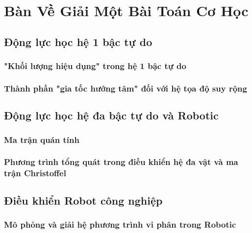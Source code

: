   
\chapter{Bàn Về Giải Một Bài Toán Cơ Học}

\section{Động lực học hệ 1 bậc tự do}

\subsection{"Khối lượng hiệu dụng" trong hệ 1 bậc tự do}

\subsection{Thành phần "gia tốc hướng tâm" đối với hệ tọa độ suy rộng}

\section{Động lực học hệ đa bậc tự do và Robotic}

\subsection{Ma trận quán tính}

\subsection{Phương trình tổng quát trong điều khiển hệ đa vật và ma trận Christoffel}

\section{Điều khiển Robot công nghiệp}

\subsection{Mô phỏng và giải hệ phương trình vi phân trong Robotic}

